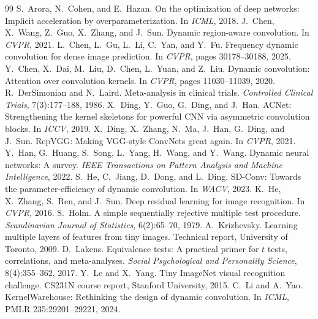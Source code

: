 \documentclass[10pt,a4paper]{article}
\begin{document}
\FloatBarrier
\begin{thebibliography}{99}\small
{} S.~Arora, N.~Cohen, and E.~Hazan. On the optimization of deep networks: Implicit acceleration by overparameterization. In \emph{ICML}, 2018.
 J.~Chen, X.~Wang, Z.~Guo, X.~Zhang, and J.~Sun. Dynamic region-aware convolution. In \emph{CVPR}, 2021.
 L.~Chen, L.~Gu, L.~Li, C.~Yan, and Y.~Fu. Frequency dynamic convolution for dense image prediction. In \emph{CVPR}, pages 30178--30188, 2025.
 Y.~Chen, X.~Dai, M.~Liu, D.~Chen, L.~Yuan, and Z.~Liu. Dynamic convolution: Attention over convolution kernels. In \emph{CVPR}, pages 11030--11039, 2020.
 R.~DerSimonian and N.~Laird. Meta-analysis in clinical trials. \emph{Controlled Clinical Trials}, 7(3):177--188, 1986.
 X.~Ding, Y.~Guo, G.~Ding, and J.~Han. ACNet: Strengthening the kernel skeletons for powerful CNN via asymmetric convolution blocks. In \emph{ICCV}, 2019.
 X.~Ding, X.~Zhang, N.~Ma, J.~Han, G.~Ding, and J.~Sun. RepVGG: Making VGG-style ConvNets great again. In \emph{CVPR}, 2021.
 Y.~Han, G.~Huang, S.~Song, L.~Yang, H.~Wang, and Y.~Wang. Dynamic neural networks: A survey. \emph{IEEE Transactions on Pattern Analysis and Machine Intelligence}, 2022.
 S.~He, C.~Jiang, D.~Dong, and L.~Ding. SD-Conv: Towards the parameter-efficiency of dynamic convolution. In \emph{WACV}, 2023.
 K.~He, X.~Zhang, S.~Ren, and J.~Sun. Deep residual learning for image recognition. In \emph{CVPR}, 2016.
 S.~Holm. A simple sequentially rejective multiple test procedure. \emph{Scandinavian Journal of Statistics}, 6(2):65--70, 1979.
 A.~Krizhevsky. Learning multiple layers of features from tiny images. Technical report, University of Toronto, 2009.
 D.~Lakens. Equivalence tests: A practical primer for $t$ tests, correlations, and meta-analyses. \emph{Social Psychological and Personality Science}, 8(4):355--362, 2017.
 Y.~Le and X.~Yang. Tiny ImageNet visual recognition challenge. CS231N course report, Stanford University, 2015.
 C.~Li and A.~Yao. KernelWarehouse: Rethinking the design of dynamic convolution. In \emph{ICML}, PMLR 235:29201--29221, 2024.

\end{thebibliography}
\end{document}
